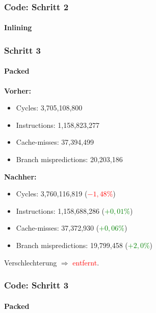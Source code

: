 \documentclass{beamer}
\newcommand{\success}[1]{\textcolor{green}{#1}}
\newcommand{\fail}[1]{\textcolor{red}{#1}}
\begin{document}
    \begin{frame}
  	\frametitle{Code: Schritt 2}
		\framesubtitle{Inlining}
		\sInlining
  \end{frame}


  \begin{frame}
  	\frametitle{Schritt 3}
  	\framesubtitle{Packed}
  	\textbf{Vorher:}
  	\begin{itemize}
			\item Cycles: 3,705,108,800 \\
			\item Instructions: 1,158,823,277\\
			\item Cache-misses: 37,394,499\\
			\item Branch mispredictions: 20,203,186\\
		\end{itemize}

		\textbf{Nachher:}
		\begin{itemize}
			\item Cycles: 3,760,116,819 (\fail{$- 1,48 \%$})\\
			\item Instructions: 1,158,688,286 (\success{$+ 0,01\%$})\\
			\item Cache-misses: 37,372,930 (\success{$+ 0,06 \%$})\\
			\item Branch mispredictions: 19,799,458 (\success{$+ 2,0\%$})\\
		\end{itemize}
		Verschlechterung $\Rightarrow$ \fail{entfernt}.
  \end{frame}

    \begin{frame}
  	\frametitle{Code: Schritt 3}
  	\framesubtitle{Packed}
		\sPacked
  \end{frame}
\end{document}
